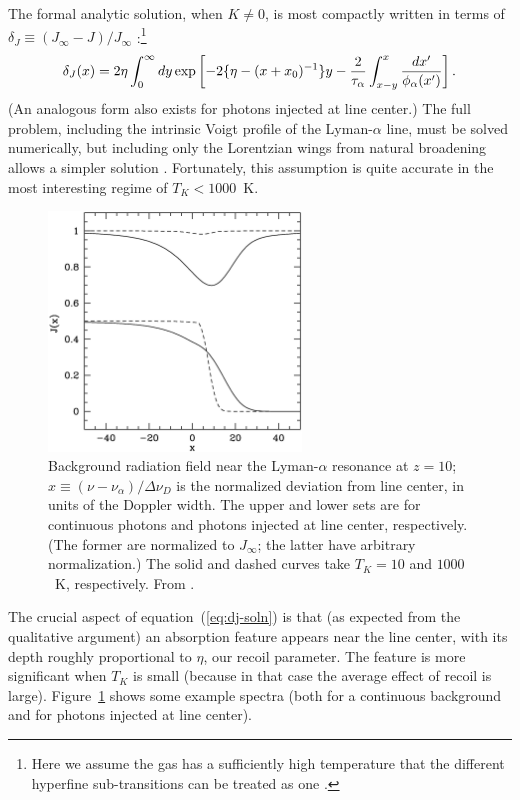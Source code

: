 \documentclass[a4paper,openany, 12pt]{book}
\begin{document}
The formal analytic solution, when $K \neq 0$, is most compactly written in terms of $\delta_J \equiv (J_\infty -
J)/J_\infty$ \cite{chen04}:\footnote{Here we assume the gas has a sufficiently high temperature that the different hyperfine sub-transitions can be treated as one \cite{hirata06}.}
\begin{equation}
\delta_J(x) = 2 \eta \int_0^\infty d y \exp \left[ - 2 \{ \eta - (x+x_0)^{-1}\} y - {2 \over \tau_\alpha} \int_{x-y}^{x} \frac{d x'}{\phi_\alpha(x')} \right].
\label{eq:dj-soln}
\end{equation}
(An analogous form also exists for photons injected at line center.) The full problem, including the intrinsic Voigt profile of the Lyman-$\alpha$ line, must be solved numerically, but including only the Lorentzian wings from natural broadening allows a simpler solution \cite{furl06-lyheat}.  Fortunately, this assumption is quite accurate in the most interesting regime of  $T_K <  1000$~K.

\begin{figure}[]
\begin{center}
\includegraphics[width=0.6\textwidth]{figure2-4}
\end{center}
\caption{Background radiation field near the Lyman-$\alpha$ resonance at $z=10$;
$x \equiv (\nu-\nu_\alpha)/\Delta \nu_D$ is the normalized deviation
from line center, in units of the Doppler width.  The upper and lower sets are for continuous photons
and photons injected at line center, respectively.  (The former are
normalized to $J_\infty$; the latter have arbitrary normalization.)
The solid and dashed curves take $T_K=10$ and $1000$~K,
respectively.  From \cite{furl06-lyheat}.}
\label{fig:lyshape}
\end{figure}

The crucial aspect of equation~(\ref{eq:dj-soln}) is that (as expected from the qualitative argument) an absorption feature appears near the line center, with its depth roughly proportional to $\eta$, our recoil parameter.  The feature is more significant when $T_K$ is small (because in that case the average effect of recoil is large). Figure~\ref{fig:lyshape} shows some example spectra (both for a continuous background and for photons injected at line center).
\end{document}

